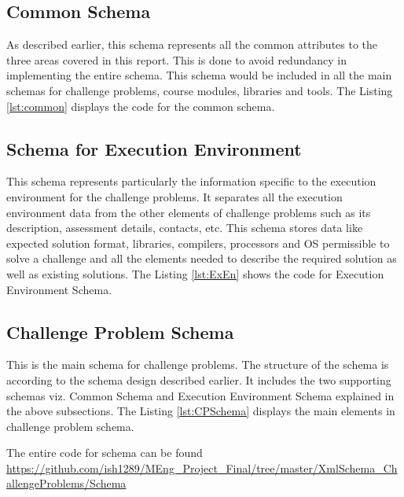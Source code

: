 \documentclass[11pt,letterpaper]{report}
\begin{document}
\subsection{Common Schema}
As described earlier, this schema represents all the common attributes to the three areas covered in this report. This is done to avoid redundancy in implementing the entire schema. This schema would be included in all the main schemas for challenge problems, course modules, libraries and tools. The Listing \ref{lst:common} displays the code for the common schema.     



\subsection{Schema for Execution Environment}
This schema represents particularly the information specific to the execution environment for the challenge problems. It separates all the execution environment data from the other elements of challenge problems such as its description, assessment details, contacts, etc. This schema stores data like expected solution format, libraries, compilers, processors and OS permissible to solve a challenge and  all the elements needed to describe the required solution as well as existing solutions. The Listing \ref{lst:ExEn} shows the code for Execution Environment Schema.



\subsection{Challenge Problem Schema}
This is the main schema for challenge problems. The structure of the schema is according to the schema design described earlier. It includes the two supporting schemas viz. Common Schema and Execution Environment Schema explained in the above subsections. The Listing \ref{lst:CPSchema} displays the main elements in challenge problem schema.


The entire code for schema can be found \url{https://github.com/ish1289/MEng_Project_Final/tree/master/XmlSchema_ChallengeProblems/Schema
}


\end{document}
